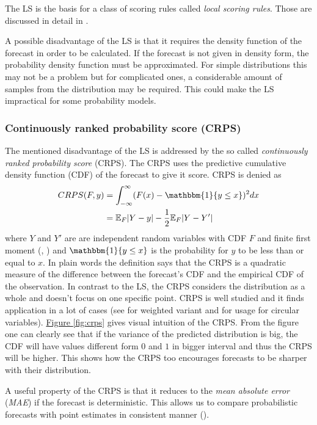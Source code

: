 \documentclass[12pt,a4paper,twoside]{scrartcl}
\numberwithin{equation}{section}
\newcommand{\reffig}[1]{\hyperref[#1]{Figure \ref*{#1}}}
\begin{document}
The LS is the basis for a class of scoring rules called \emph{local scoring rules}. Those are discussed in detail in \cite{ehm2012}.

A possible disadvantage of the LS is that it requires the density function of the forecast in order to be calculated. If the forecast is not given in density form, the probability density function must be approximated. For simple distributions this may not be a problem but for complicated ones, a considerable amount of samples from the distribution may be required. This could make the LS impractical for some probability models.

\subsubsection{Continuously ranked probability score (CRPS)}
\label{sec:crps}

The mentioned disadvantage of the LS is addressed by the so called \emph{continuously ranked probability score} (CRPS). The CRPS uses the predictive cumulative density function (CDF) of the forecast to give it score. CRPS is denied as
\begin{align}
  \label{eq:crps}
  CRPS(F,y)  &= \int_{-\infty}^{\infty}(F(x) - \mathbbm{1}\{y \leq x \})^2dx \\
             &= \mathbb{E}_F|Y - y| - \frac{1}{2}\mathbb{E}_F|Y - Y'|
\end{align}
where \(Y\) and \(Y'\) are are independent random variables with CDF \(F\) and finite first moment (\cite{rafteryg2007}, \cite{matheson1976}) and \(\mathbbm{1}\{y \leq x \}\) is the probability for \(y\) to be less than or equal to \(x \). In plain words the definition says that the CRPS is a quadratic measure of the difference between the forecast's CDF and the empirical CDF of the observation. In contrast to the LS, the CRPS considers the distribution as a whole and doesn't focus on one specific point. CRPS is well studied and it finds application in a lot of cases (see \cite{ranjan2011} for weighted variant and \cite{grimit2007} for usage for circular variables). \reffig{fig:crps} gives visual intuition of the CRPS. From the figure one can clearly see that if the variance of the predicted distribution is big, the CDF will have values different form \(0\) and \(1\) in bigger interval and thus the CRPS will be higher. This shows how the CRPS too encourages forecasts to be sharper with their distribution.


A useful property of the CRPS is that it reduces to the \emph{mean absolute error} (\emph{MAE}) if the forecast is deterministic. This allows us to compare probabilistic forecasts with point estimates in consistent manner (\cite{gneiting2014}).
\end{document}
